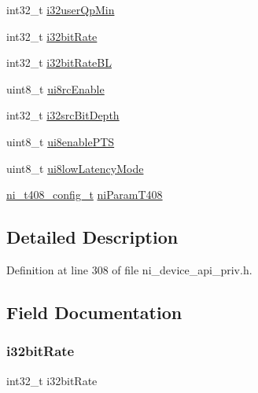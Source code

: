 \begin{DoxyCompactItemize}
int32\+\_\+t \mbox{\hyperlink{struct__ni__encoder__config__t_a9b1cfbd3a3870bb01998056e6d3cd2e4}{i32user\+Qp\+Min}}
\item 
int32\+\_\+t \mbox{\hyperlink{struct__ni__encoder__config__t_ae3216b6a47c9c3cd41f30da07f044ebb}{i32bit\+Rate}}
\item 
int32\+\_\+t \mbox{\hyperlink{struct__ni__encoder__config__t_a3c17e43b590161ffd59a8ee7df4bae39}{i32bit\+Rate\+BL}}
\item 
uint8\+\_\+t \mbox{\hyperlink{struct__ni__encoder__config__t_a5a4294be589632753c79c548ccd49e68}{ui8rc\+Enable}}
\item 
int32\+\_\+t \mbox{\hyperlink{struct__ni__encoder__config__t_af7230f27c8cb24935e0651714ed09887}{i32src\+Bit\+Depth}}
\item 
uint8\+\_\+t \mbox{\hyperlink{struct__ni__encoder__config__t_a48ac4ba8225049e8a09085ba863f8a58}{ui8enable\+P\+TS}}
\item 
uint8\+\_\+t \mbox{\hyperlink{struct__ni__encoder__config__t_a3bd0707275f514091b2052764363c829}{ui8low\+Latency\+Mode}}
\item 
\mbox{\hyperlink{ni__device__api__priv_8h_ab1c9fee12ac7f38b4a737a0e093b632d}{ni\+\_\+t408\+\_\+config\+\_\+t}} \mbox{\hyperlink{struct__ni__encoder__config__t_a1f7eb1f2672d51cc8a188f83e0cd3e71}{ni\+Param\+T408}}
\end{DoxyCompactItemize}


\subsection{Detailed Description}


Definition at line 308 of file ni\+\_\+device\+\_\+api\+\_\+priv.\+h.



\subsection{Field Documentation}
\mbox{\label{struct__ni__encoder__config__t_ae3216b6a47c9c3cd41f30da07f044ebb}} 
\subsubsection{\texorpdfstring{i32bitRate}{i32bitRate}}
{\footnotesize\ttfamily int32\+\_\+t i32bit\+Rate}

